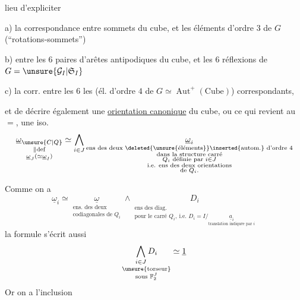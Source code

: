 lieu d'expliciter

a) la correspondance entre  sommets du cube, et les  éléments d'ordre $3$ de $G$ (``rotations-sommets'')

b)  entre les $6$ paires d'arêtes antipodiques du cube, et les $6$  réflexions de $G=\unsure{\mathcal{G}_I|\mathfrak{S}_I}$

c) la corr. entre les $6$  les  (él. d'ordre $4$ de $G\simeq\operatorname{Aut}^+(\text{Cube})$) correspondants,

et de décrire également une \uline{orientation canonique} du cube, ou ce qui revient au $=$, une  iso.
\[
\underset{\substack{\Vert\mathrm{def}\\\underline{\omega}_J(\simeq\underline{\omega}_I)}}
{\underline{\omega}_{\unsure{C|Q}}}
\simeq \bigwedge_{i\in J}
\underset{\substack{\text{ens des deux \deleted{\unsure{éléments}}\inserted{autom.} d'ordre $4$}\\
\text{dans la structure carré}\\
Q_i\text{ définie par }i\in J\\
\text{i.e. ens des deux orientations}\\
\text{de }Q_i.}}{\underline{\omega}_i}
\]

Comme on a
\[
\underline{\omega}_i\simeq
\underset{\substack{\text{ens. des deux}\\\text{codiagonales de }Q_i}}
{\underline{\omega}}\wedge
\underset{\substack{\text{ens des diag.}\\
\text{pour le carré }Q_i,\ \text{i.e. }D_i=
I/\underset{\text{translation indiquée par }i}{\underline{a}_i}}}{D_i}
\]
la formule  s'écrit aussi
\[
\underset{\substack{\text{\unsure{torseur}}\\\text{sous }\mathbb{F}_2^J}}
{\bigwedge_{i\in J}D_i}\simeq\underline{1}
\]
Or on a  l'inclusion
